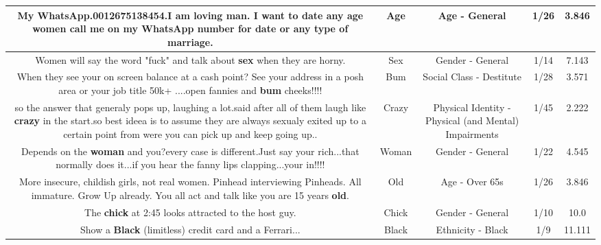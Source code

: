 \documentclass[11pt]{article}
\newlength\mylength
\begin{document}
\begin{center}
\begin{longtable}{|C{.65\mylength}|C{.30\mylength}|C{.12\mylength}|C{.12\mylength}|C{.12\mylength}|}
  \small My WhatsApp.0012675138454.I am loving man. I want to date any \textbf{age} women call me on my WhatsApp number for date or any type of marriage.\normalsize   & Age & Age - General & 1/26 & 3.846 \\  \hline
  \small Women will say the word "fuck" and talk about \textbf{sex} when they are horny.\normalsize   & Sex & Gender - General & 1/14 & 7.143 \\  \hline
  \small When they see your on screen  balance at a cash point? See your address in a posh area or your job title 50k+ ....open fannies and \textbf{bum} cheeks!!!!\normalsize   & Bum & Social Class - Destitute & 1/28 & 3.571 \\  \hline
  \small so the answer that  generaly pops up, laughing a lot.said after all of them laugh like \textbf{crazy} in the start.so best ideea is to assume they are always sexualy exited up to a certain point from were you can pick up and keep going up..\normalsize   & Crazy & Physical Identity - Physical (and Mental) Impairments & 1/45 & 2.222 \\  \hline
  \small Depends on the \textbf{woman} and you?every case is different.Just say your rich...that normally does it...if you hear the fanny lips clapping...your in!!!!\normalsize   & Woman & Gender - General & 1/22 & 4.545 \\  \hline
  \small More insecure, childish girls, not real women.  Pinhead interviewing Pinheads.   All immature.  Grow Up already.  You all act and talk like you are 15 years \textbf{old}.\normalsize   & Old & Age - Over 65s & 1/26 & 3.846 \\  \hline
  \small The \textbf{chick} at 2:45 looks attracted to the host guy.\normalsize   & Chick & Gender - General & 1/10 & 10.0 \\  \hline
  \small Show a \textbf{Black} (limitless) credit card and a Ferrari...\normalsize   & Black & Ethnicity - Black & 1/9 & 11.111 \\  \hline

\end{longtable}
\end{center}
\end{document}
